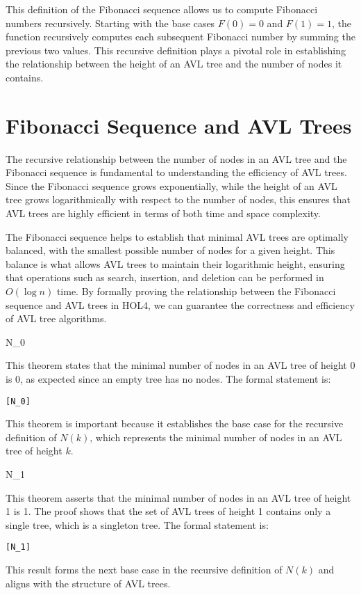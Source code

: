     This definition of the Fibonacci sequence allows us to compute Fibonacci numbers recursively. Starting with the base cases \( F(0) = 0 \) and \( F(1) = 1 \), the function recursively computes each subsequent Fibonacci number by summing the previous two values. This recursive definition plays a pivotal role in establishing the relationship between the height of an AVL tree and the number of nodes it contains.


\section{Fibonacci Sequence and AVL Trees}

    The recursive relationship between the number of nodes in an AVL tree and the Fibonacci sequence is fundamental to understanding the efficiency of AVL trees. Since the Fibonacci sequence grows exponentially, while the height of an AVL tree grows logarithmically with respect to the number of nodes, this ensures that AVL trees are highly efficient in terms of both time and space complexity.

    The Fibonacci sequence helps to establish that minimal AVL trees are optimally balanced, with the smallest possible number of nodes for a given height. This balance is what allows AVL trees to maintain their logarithmic height, ensuring that operations such as search, insertion, and deletion can be performed in \( O(\log n) \) time. By formally proving the relationship between the Fibonacci sequence and AVL trees in HOL4, we can guarantee the correctness and efficiency of AVL tree algorithms.

    \begin{thm}{N\_0}

    This theorem states that the minimal number of nodes in an AVL tree of height 0 is 0, as expected since an empty tree has no nodes. The formal statement is:
    \begin{alltt}
    	[N_0]
    	\HOLTokenTurnstile{}   \HOLSymConst{=} 
    \end{alltt}
    
    \end{thm}
    This theorem is important because it establishes the base case for the recursive definition of \( N(k) \), which represents the minimal number of nodes in an AVL tree of height \( k \).


    \begin{thm}{N\_1}

    This theorem asserts that the minimal number of nodes in an AVL tree of height 1 is 1. The proof shows that the set of AVL trees of height 1 contains only a single tree, which is a singleton tree. The formal statement is:
    \begin{alltt}
    	[N_1]
    	\HOLTokenTurnstile{}   \HOLSymConst{=} 
    \end{alltt}
    
    \end{thm}
    This result forms the next base case in the recursive definition of \( N(k) \) and aligns with the structure of AVL trees.


